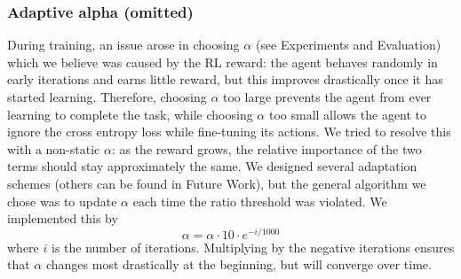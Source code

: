     \subsubsection{Adaptive alpha (omitted)}\label{sub:Adaptive_Alpha}
        During training, an issue arose in choosing $\alpha$ (see Experiments and
        Evaluation) which we believe was caused by the RL reward: the agent behaves
        randomly in early iterations and earns little reward, but this improves
        drastically once it has started learning. Therefore, choosing $\alpha$ too large
        prevents the agent from ever learning to complete the task, while choosing
        $\alpha$ too small allows the agent to ignore the cross entropy loss while
        fine-tuning its actions. We tried to resolve this with a non-static $\alpha$: as
        the reward grows, the relative importance of the two terms should stay
        approximately the same. We designed several adaptation schemes (others can be
        found in Future Work), but the general algorithm we chose was to update $\alpha$
        each time the ratio threshold was violated. We implemented this by
        \begin{equation}
            \alpha = \alpha \cdot 10 \cdot e^{-i / 1000}
        \end{equation}
        where $i$ is the number of iterations. Multiplying by the negative iterations
        ensures that $\alpha$ changes most drastically at the beginning, but will
        converge over time.